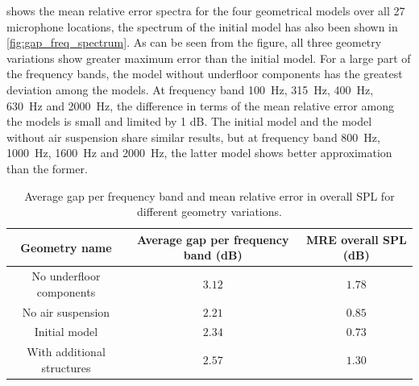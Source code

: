 \noindent{} shows the mean relative error spectra for the four geometrical models over all 27 microphone locations, the spectrum of the initial model has also been shown in \cref{fig:gap_freq_spectrum}. As can be seen from the figure, all three geometry variations show greater maximum error than the initial model. For a large part of the frequency bands, the model without underfloor components has the greatest deviation among the models. At frequency band \SI{100}{\hertz}, \SI{315}{\hertz}, \SI{400}{\hertz}, \SI{630}{\hertz} and \SI{2000}{\hertz}, the difference in terms of the mean relative error among the models is small and limited by 1 dB. The initial model and the model without air suspension share similar results, but at frequency band \SI{800}{\hertz}, \SI{1000}{\hertz}, \SI{1600}{\hertz} and \SI{2000}{\hertz}, the latter model shows better approximation than the former.

\begin{table}
	\centering
	\caption{Average gap per frequency band and mean relative error in overall SPL for different geometry variations.}
	\label{tab:geometry_variation_MRE}
	\begin{tabular}{c|c|c}
		Geometry name              & Average gap per frequency band (dB) & MRE overall SPL (dB) \\ \hline
		No underfloor components   & $3.12$                       & $1.78$        \\
		No air suspension          & $2.21$                       & $0.85$        \\
		Initial model              & $2.34$                       & $0.73$        \\
		With additional structures & $2.57$                       & $1.30$       
	\end{tabular}
\end{table}

